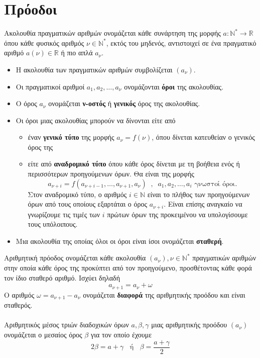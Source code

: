 \documentclass[twoside,nofonts,internet,shmeiwseis]{thewria}
\begin{document}
\section{Πρόοδοι}
\orismoi
{}
Ακολουθία πραγματικών αριθμών ονομάζεται κάθε συνάρτηση της μορφής $ a:\mathbb{N}^*\rightarrow\mathbb{R} $ όπου κάθε φυσικός αριθμός $ \nu\in\mathbb{N}^* $, εκτός του μηδενός, αντιστοιχεί σε ένα πραγματικό αριθμό $ a(\nu)\in\mathbb{R} $ ή πιο απλά $ a_\nu $.
\begin{itemize}[itemsep=0mm]
\item Η ακολουθία των πραγματικών αριθμών συμβολίζεται $ \left( a_\nu\right)  $.
\item Οι πραγματικοί αριθμοί $ a_1, a_2,\ldots,a_\nu $ ονομάζονται \textbf{όροι} της ακολουθίας.
\item Ο όρος $ a_\nu $ ονομάζεται \textbf{ν-οστός} ή \textbf{γενικός} όρος της ακολουθίας.
\item Οι όροι μιας ακολουθίας μπορούν να δίνονται είτε από 
\begin{itemize}[itemsep=0mm]
\item έναν \textbf{γενικό τύπο} της μορφής $ a_\nu=f(\nu) $, όπου δίνεται κατευθείαν ο γενικός όρος της
\item είτε από \textbf{αναδρομικό τύπο} όπου κάθε όρος δίνεται με τη βοήθεια ενός ή περισσότερων προηγούμενων όρων. Θα είναι της μορφής \[ a_{\nu+i}=f(a_{\nu+i-1},\ldots,a_{\nu+1},a_\nu)\;\;,\;\;a_1,a_2,\ldots,a_i\textrm{ γνωστοί όροι.} \] Στον αναδρομικό τύπο, ο αριθμός $ i\in\mathbb{N} $ είναι το πλήθος των προηγούμενων όρων από τους οποίους εξαρτάται ο όρος $ a_{\nu+i} $. Είναι επίσης αναγκαίο να γνωρίζουμε τις τιμές των $ i $ πρώτων όρων της προκειμένου να υπολογίσουμε τους υπόλοιπους.
\end{itemize}
\item Μια ακολουθία της οποίας όλοι οι όροι είναι ίσοι ονομάζεται \textbf{σταθερή}.
\end{itemize}
Αριθμητική πρόοδος ονομάζεται κάθε ακολουθία $ (a_\nu),\nu\in\mathbb{N}^* $ πραγματικών αριθμών στην οποία κάθε όρος της προκύπτει από τον προηγούμενο, προσθέτοντας κάθε φορά τον ίδιο σταθερό αριθμό. Ισχύει δηλαδή
\[ a_{\nu+1}=a_\nu+\omega \]
Ο αριθμός $ \omega=a_{\nu+1}-a_\nu $ ονομάζεται \textbf{διαφορά} της αριθμητικής προόδου και είναι σταθερός.\\\\
Αριθμητικός μέσος τριών διαδοχικών όρων $ a,\beta,\gamma $ μιας αριθμητικής προόδου $ (a_\nu) $ ονομάζεται ο μεσαίος όρος $ \beta $ για τον οποίο έχουμε \[ 2\beta=a+\gamma\;\;\textrm{ ή }\;\;\beta=\frac{a+\gamma}{2} \]
\end{document}
